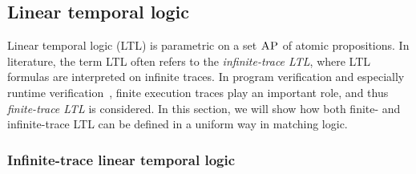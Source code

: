 \documentclass[acmsmall,review,anonymous]{acmart}
\newcommand{\AP}{\textsc{AP}}
\begin{document}
\subsection{Linear temporal logic}
\label{sec_LTL}


Linear temporal logic (LTL) is parametric 
on a set $\AP$ of atomic propositions.
In literature, the term LTL often refers to the \emph{infinite-trace LTL},
where LTL formulas are interpreted on infinite traces.
In program verification and especially runtime verification~\cite{bibid},
finite execution traces play an important role, and thus
\emph{finite-trace LTL} is considered.
In this section, we will show how
both finite- and infinite-trace LTL can be defined in a uniform way in matching logic.

\subsubsection{Infinite-trace linear temporal logic}
\end{document}
